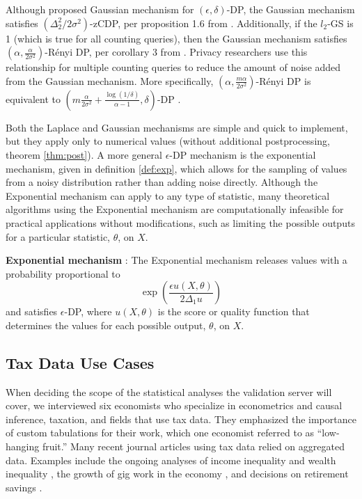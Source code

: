 Although \citet{dwork2014algorithmic} proposed Gaussian mechanism for $(\epsilon,\delta)$-DP, the Gaussian mechanism satisfies $(\Delta^2_2/2\sigma^2)$-zCDP, per proposition 1.6 from \citet{bun2016concentrated}. Additionally, if the $l_2$-GS is 1 (which is true for all counting queries), then the Gaussian mechanism satisfies $\left(\alpha, \frac{\alpha}{2\sigma^2}\right)$-R\'enyi DP, per corollary 3 from  \citet{mironov2017renyi}. Privacy researchers use this relationship for multiple counting queries to reduce the amount of noise added from the Gaussian mechanism. More specifically, $\left(\alpha, \frac{m\alpha}{2\sigma^2}\right)$-R\'enyi DP is equivalent to $\left(m\frac{\alpha}{2\sigma^2}+\frac{\log(1/\delta)}{\alpha-1}, \delta\right)$-DP \citep{mironov2017renyi,wang2019subsampled}.

Both the Laplace and Gaussian mechanisms are simple and quick to implement, but they apply only to numerical values (without additional postprocessing, theorem \ref{thm:post}). A more general $\epsilon$-DP mechanism is the exponential mechanism, given in definition \ref{def:exp}, which allows for the sampling of values from a noisy distribution rather than adding noise directly. Although the Exponential mechanism can apply to any type of statistic, many theoretical algorithms using the Exponential mechanism are computationally infeasible for practical applications without modifications, such as limiting the possible outputs for a particular statistic, $\theta$, on $X$.

\begin{defn}\label{def:exp} \textbf{Exponential mechanism} \citep{mcsherry2007mechanism}:
    The Exponential mechanism releases values with a probability proportional to
        \begin{equation}\label{eqn:exp}
            \exp \left(\frac{\epsilon u(X, \theta)}{2\Delta_1 u}\right)
        \end{equation}
    and satisfies $\epsilon$-DP, where $u(X,\theta)$ is the score or quality function that determines the values for each possible output, $\theta$, on $X$.
\end{defn}

\subsection{Tax Data Use Cases}\label{subsec:data}
When deciding the scope of the statistical analyses the validation server will cover, we interviewed six economists who specialize in econometrics and causal inference, taxation, and fields that use tax data. They emphasized the importance of custom tabulations for their work, which one economist referred to as ``low-hanging fruit.'' Many recent journal articles using tax data relied on aggregated data. Examples include the ongoing analyses of income inequality \citep{auten2018income} and wealth inequality \citep{smith2019top}, the growth of gig work in the economy \citep{collins2019gig}, and decisions on retirement savings \citep{brady2020reconciling}.

